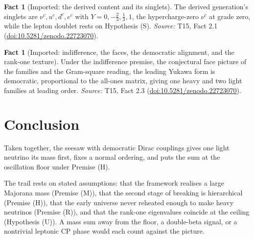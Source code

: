\documentclass[11pt]{article}
\theoremstyle{definition}
\newtheorem{fact}[theorem]{Fact}
\theoremstyle{plain}
\begin{document}
\begin{fact}[Imported: the derived content and its singlets]\label{c:neutrino.imported-derived-content-singlets}
The derived generation's singlets are $\nu^{c}, u^{c}, d^{c}, e^{c}$ with $Y = 0, -\tfrac23, \tfrac13, 1$, the hypercharge-zero $\nu^{c}$ at grade zero, while the lepton doublet rests on Hypothesis (S).
\emph{Source:} T15, Fact 2.1 (\href{https://doi.org/10.5281/zenodo.22723070}{doi:10.5281/zenodo.22723070}).
\end{fact}

\begin{fact}[Imported: indifference, the faces, the democratic alignment, and the rank-one texture]\label{c:neutrino.imported-indifference-faces-democratic-alignment-rank}
Under the indifference premise, the conjectural face picture of the families and the Gram-square reading, the leading Yukawa form is democratic, proportional to the all-ones matrix, giving one heavy and two light families at leading order.
\emph{Source:} T15, Fact 2.3 (\href{https://doi.org/10.5281/zenodo.22723070}{doi:10.5281/zenodo.22723070}).
\end{fact}

\section*{Conclusion}
Taken together, the seesaw with democratic Dirac couplings gives one light neutrino its mass first, fixes a normal ordering, and puts the sum at the oscillation floor under Premise (H).

The trail rests on stated assumptions: that the framework realises a large Majorana mass (Premise (M)), that the second stage of breaking is hierarchical (Premise (H)), that the early universe never reheated enough to make heavy neutrinos (Premise (R)), and that the rank-one eigenvalues coincide at the ceiling (Hypothesis (U)). A mass sum away from the floor, a double-beta signal, or a nontrivial leptonic CP phase would each count against the picture.
\end{document}
